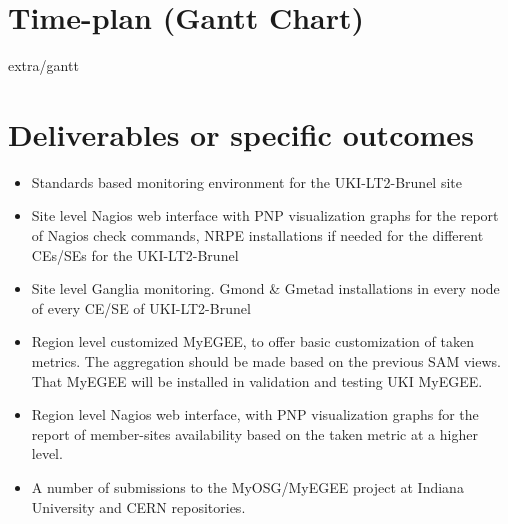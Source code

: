 \section[Time plan]{Time-plan (Gantt Chart)}

 {extra/gantt}
\section[Deliverables]{Deliverables or specific outcomes}

\begin{itemize}
  \item Standards based monitoring environment for the UKI-LT2-Brunel site
  \item Site level Nagios web interface with PNP visualization graphs for the report of Nagios check commands, NRPE installations if needed for the different CEs/SEs for the UKI-LT2-Brunel
  \item Site level Ganglia monitoring. Gmond \& Gmetad installations in every node of every CE/SE of UKI-LT2-Brunel
  \item Region level customized MyEGEE, to offer basic customization of taken metrics. The aggregation should be made based on the previous SAM views. That MyEGEE will be installed in validation and testing UKI MyEGEE.
  \item Region level Nagios web interface, with PNP visualization graphs for the report of member-sites availability based on the taken metric at a higher level.
  \item A number of submissions to the MyOSG/MyEGEE project at Indiana University and CERN repositories.
\end{itemize}
